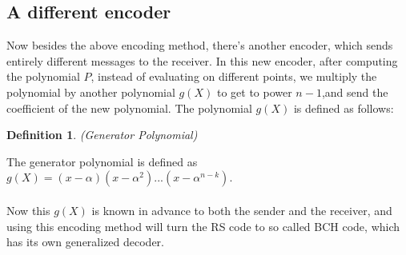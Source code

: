 \documentclass{article}
\newtheorem{Definition}{Definition}
\begin{document}
\subsection{A different encoder}
Now besides the above encoding method, there's another encoder, which sends entirely different messages to the receiver. In this new encoder, after computing the polynomial $P$, instead of evaluating on different points, we multiply the polynomial by another polynomial $g(X)$ to get to power $n-1$,and send the coefficient of the new polynomial. The polynomial $g(X)$ is defined as follows:
\begin{Definition}(Generator Polynomial)\end{Definition}
\noindent The generator polynomial is defined as $g(X) = (x-\alpha)(x-\alpha^2)...(x-\alpha^{n-k})$.\\\\
Now this $g(X)$ is known in advance to both the sender and the receiver, and using this encoding method will turn the RS code to so called BCH code, which has its own generalized decoder.
\end{document}
